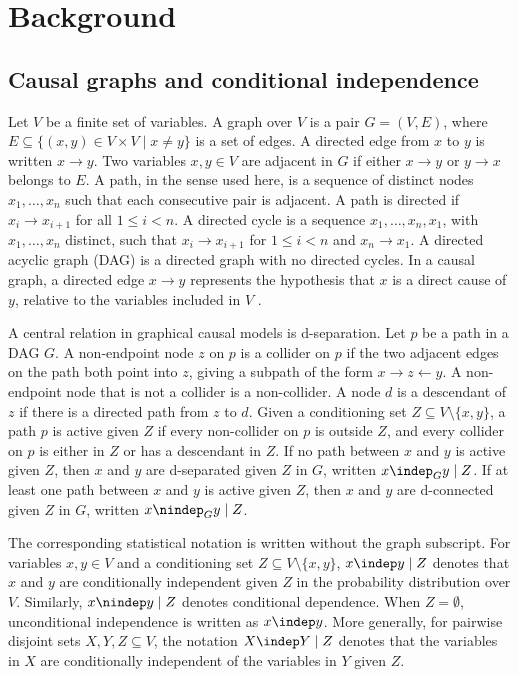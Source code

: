 \chapter{Background}

\section{Causal graphs and conditional independence}

Let \(V\) be a finite set of variables. A graph over \(V\) is a pair \(G=(V,E)\), where \(E \subseteq \{(x,y) \in V \times V \mid x \neq y\}\) is a set of edges. A directed edge from \(x\) to \(y\) is written \(x \to y\). Two variables \(x,y \in V\) are adjacent in \(G\) if either \(x \to y\) or \(y \to x\) belongs to \(E\). A path, in the sense used here, is a sequence of distinct nodes \(x_1,\ldots,x_n\) such that each consecutive pair is adjacent. A path is directed if \(x_i \to x_{i+1}\) for all \(1 \leq i < n\). A directed cycle is a sequence \(x_1,\ldots,x_n,x_1\), with \(x_1,\ldots,x_n\) distinct, such that \(x_i \to x_{i+1}\) for \(1 \leq i < n\) and \(x_n \to x_1\). A directed acyclic graph (DAG) is a directed graph with no directed cycles. In a causal graph, a directed edge \(x \to y\) represents the hypothesis that \(x\) is a direct cause of \(y\), relative to the variables included in \(V\) \cite{russo2024argumentative,glymour2019review}.

A central relation in graphical causal models is d-separation. Let \(p\) be a path in a DAG \(G\). A non-endpoint node \(z\) on \(p\) is a collider on \(p\) if the two adjacent edges on the path both point into \(z\), giving a subpath of the form \(x \to z \leftarrow y\). A non-endpoint node that is not a collider is a non-collider. A node \(d\) is a descendant of \(z\) if there is a directed path from \(z\) to \(d\). Given a conditioning set \(Z \subseteq V \setminus \{x,y\}\), a path \(p\) is active given \(Z\) if every non-collider on \(p\) is outside \(Z\), and every collider on \(p\) is either in \(Z\) or has a descendant in \(Z\). If no path between \(x\) and \(y\) is active given \(Z\), then \(x\) and \(y\) are d-separated given \(Z\) in \(G\), written \(x \indep_G y \mid Z\). If at least one path between \(x\) and \(y\) is active given \(Z\), then \(x\) and \(y\) are d-connected given \(Z\) in \(G\), written \(x \nindep_G y \mid Z\).

The corresponding statistical notation is written without the graph subscript. For variables \(x,y \in V\) and a conditioning set \(Z \subseteq V \setminus \{x,y\}\), \(x \indep y \mid Z\) denotes that \(x\) and \(y\) are conditionally independent given \(Z\) in the probability distribution over \(V\). Similarly, \(x \nindep y \mid Z\) denotes conditional dependence. When \(Z=\emptyset\), unconditional independence is written as \(x \indep y\). More generally, for pairwise disjoint sets \(X,Y,Z \subseteq V\), the notation \(X \indep Y \mid Z\) denotes that the variables in \(X\) are conditionally independent of the variables in \(Y\) given \(Z\).

